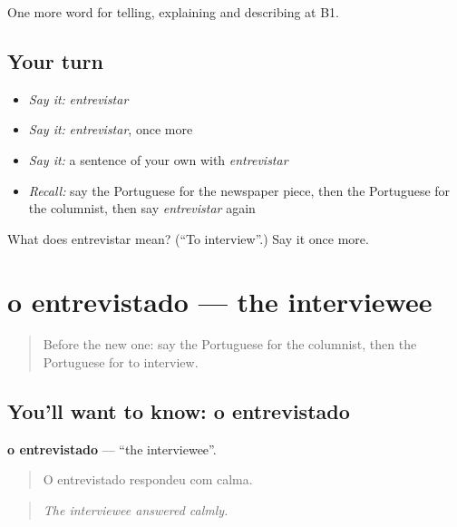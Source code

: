 \begin{grammarlens}[title={What you've built}]
One more word for telling, explaining and describing at B1.
\end{grammarlens}

\subsection*{Your turn}
\begin{itemize}
\raggedright
  \item \emph{Say it:} \emph{entrevistar}
  \item \emph{Say it:} \emph{entrevistar}, once more
  \item \emph{Say it:} a sentence of your own with \emph{entrevistar}
  \item \emph{Recall:} say the Portuguese for the newspaper piece, then the Portuguese for the columnist, then say \emph{entrevistar} again
\end{itemize}

\begin{tcolorbox}[breakable,colback=teal!4,colframe=teal!35!black,title={Before you move on}]
What does entrevistar mean? (\textquotedblleft{}To interview\textquotedblright{}.) Say it once more.
\end{tcolorbox}
\section[o entrevistado]{o entrevistado — the interviewee}

\label{lesson:PT-C285-entrevistado}



\begin{quote}
Before the new one: say the Portuguese for the columnist, then the Portuguese for to interview.
\end{quote}

\subsection*{You'll want to know: o entrevistado}
\textbf{o entrevistado} — \textquotedblleft{}the interviewee\textquotedblright{}.

\begin{quote}
O entrevistado respondeu com calma.
\end{quote}

\begin{quote}
\emph{The interviewee answered calmly.}
\end{quote}

